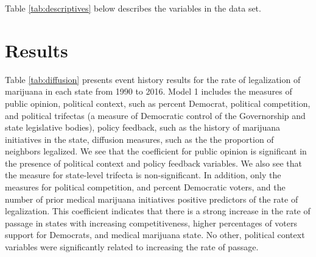 Table \ref{tab:descriptives} below describes the variables in the data set. 




\section{Results}

Table \ref{tab:diffusion} presents event history results for the rate of legalization of marijuana in each state from 1990 to 2016. Model 1 includes the measures of public opinion, political context, such as percent Democrat, political competition, and political trifectas (a measure of Democratic control of the Governorship and state legislative bodies), policy feedback, such as the history of marijuana initiatives in the state,  diffusion measures, such as the the proportion of neighbors legalized. We see that the coefficient for public opinion is significant in the presence of political context and policy feedback variables. We also see that the measure for state-level trifecta is non-significant. In addition, only the measures for political competition, and percent Democratic voters, and the number of prior medical marijuana initiatives positive predictors of the rate of legalization. This coefficient indicates that there is a strong increase in the rate of passage in states with increasing competitiveness, higher percentages of voters support for Democrats, and medical marijuana state. No other, political context variables were significantly related to increasing the rate of passage. 




%

